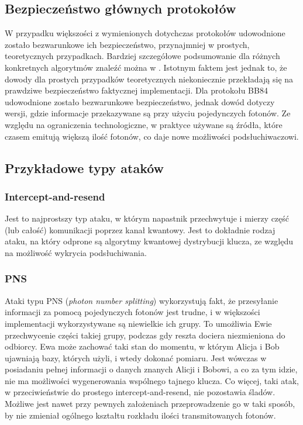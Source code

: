 \documentclass[10pt]{article}
\begin{document}
\subsection{Bezpieczeństwo głównych protokołów}

W przypadku większości z wymienionych dotychczas protokołów udowodnione zostało bezwarunkowe ich
bezpieczeństwo, przynajmniej w prostych, teoretycznych przypadkach. Bardziej szczegółowe podsumowanie
dla różnych konkretnych algorytmów znaleźć można w \cite{Scarani09}. Istotnym faktem jest jednak to,
że dowody dla prostych przypadków teoretycznych niekoniecznie przekładają się na prawdziwe
bezpieczeństwo faktycznej implementacji. Dla protokołu BB84 udowodnione zostało bezwarunkowe
bezpieczeństwo\cite{Inamori07}, jednak dowód dotyczy wersji, gdzie informacje przekazywane są przy 
użyciu pojedynczych fotonów. Ze względu na ograniczenia technologiczne, w praktyce używane są źródła,
które czasem emitują większą ilość fotonów, co daje nowe możliwości podsłuchiwaczowi.


\subsection{Przykładowe typy ataków}

\subsubsection*{Intercept-and-resend}

Jest to najprostszy typ ataku, w którym napastnik przechwytuje i mierzy część (lub całość) komunikacji
poprzez kanał kwantowy. Jest to dokładnie rodzaj ataku, na który odprone są algorytmy kwantowej
dystrybucji klucza, ze względu na możliwość wykrycia podsłuchiwania.

\subsubsection*{PNS}

Ataki typu PNS (\emph{photon number splitting}) wykorzystują fakt, że przesyłanie informacji za
pomocą pojedynczych fotonów jest trudne, i w większości implementacji wykorzystywane są niewielkie
ich grupy. To umożliwia Ewie przechwycenie części takiej grupy, podczas gdy reszta dociera 
niezmieniona do odbiorcy. Ewa może zachować taki stan do momentu, w którym Alicja i Bob ujawniają
bazy, których użyli, i wtedy dokonać pomiaru. Jest wówczas w posiadaniu pełnej informacji o danych
znanych Alicji i Bobowi, a co za tym idzie, nie ma możliwości wygenerowania wspólnego tajnego
klucza. Co więcej, taki atak, w przeciwieństwie do prostego intercept-and-resend, nie pozostawia
śladów. Możliwe jest nawet przy pewnych założeniach przeprowadzenie go w taki sposób, by nie zmieniał
ogólnego kształtu rozkładu ilości transmitowanych fotonów\cite{Lutkenhaus02}.
\end{document}
